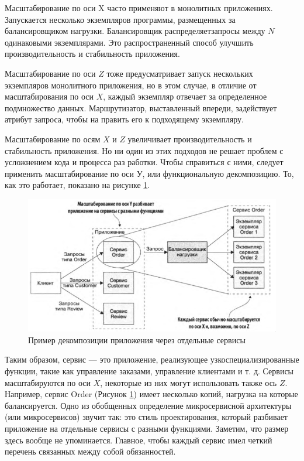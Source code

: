 Масштабирование по оси X часто применяют в монолитных приложениях. 
Запускается несколько экземпляров программы, размещенных за балансировщиком нагрузки. 
Балансировщик распределяетзапросы между $N$ одинаковыми экземплярами. 
Это распространенный способ улучшить
производительность и стабильность приложения.

Масштабирование по оси $Z$ тоже предусматривает запуск нескольких экземпляров
монолитного приложения, но в этом случае, в отличие от масштабирования по
оси $X$, каждый экземпляр отвечает за определенное подмножество данных.
Маршрутизатор, выставленный впереди, задействует атрибут запроса, чтобы на
править его к подходящему экземпляру. 

Масштабирование по осям $X$ и $Z$ увеличивает производительность и стабильность приложения.
Но ни один из этих подходов не решает проблем с усложнением кода и процесса раз
работки. Чтобы справиться с ними, следует применить масштабирование по оси $У$,
или функциональную декомпозицию. То, как это работает, показано на рисунке \ref{fig:y}.
\begin{figure}[H]
    \centering
    \includegraphics[width=0.8\linewidth]{img/y.png}
    \caption{Пример декомпозиции приложения через отдельные сервисы}
    \label{fig:y}
\end{figure}

Таким образом, сервис — это приложение, реализующее узкоспециализированные функции, такие как управление заказами, управление клиентами и т. д. 
Сервисы масштабируются по оси $X$, некоторые из них могут использовать также ось $Z$. Например,
сервис Order (Рисунок \ref{fig:y}) имеет несколько копий, нагрузка на которые балансируется.
Одно из обобщенных определение микросервисной архитектуры (или микросервисов)
звучит так: это стиль проектирования, который разбивает приложение на отдельные
сервисы с разными функциями. Заметим, что размер здесь вообще не упоминается.
Главное, чтобы каждый сервис имел четкий перечень связанных между собой обязанностей.

